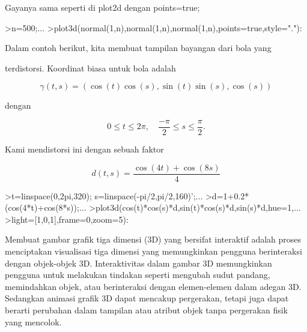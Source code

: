 \documentclass[a4paper,10pt]{article}
\begin{document}
\begin{eulernotebook}
\begin{eulercomment}
\begin{eulercomment}
\begin{eulercomment}
Gayanya sama seperti di plot2d dengan points=true;
\end{eulercomment}
\begin{eulerprompt}
>n=500;...
>plot3d(normal(1,n),normal(1,n),normal(1,n),points=true,style="."):
\end{eulerprompt}
\begin{eulercomment}
\end{eulercomment}
\begin{eulerttcomment}
 Dalam contoh berikut, kita membuat tampilan bayangan dari bola yang
\end{eulerttcomment}
\begin{eulercomment}
terdistorsi. Koordinat biasa untuk bola adalah

\end{eulercomment}
\begin{eulerformula}
\[
\gamma(t,s) = (\cos(t)\cos(s),\sin(t)\sin(s),\cos(s))
\]
\end{eulerformula}
\begin{eulercomment}
dengan

\end{eulercomment}
\begin{eulerformula}
\[
0 \le t \le 2\pi, \quad \frac{-\pi}{2} \le s \le \frac{\pi}{2}.
\]
\end{eulerformula}
\begin{eulercomment}
Kami mendistorsi ini dengan sebuah faktor

\end{eulercomment}
\begin{eulerformula}
\[
d(t,s) = \frac{\cos(4t)+\cos(8s)}{4}
\]
\end{eulerformula}
\begin{eulerprompt}
>t=linspace(0,2pi,320); s=linspace(-pi/2,pi/2,160)';...
>d=1+0.2*(cos(4*t)+cos(8*s));...
>plot3d(cos(t)*cos(s)*d,sin(t)*cos(s)*d,sin(s)*d,hue=1,...
>light=[1,0,1],frame=0,zoom=5):
\end{eulerprompt}
\begin{eulercomment}
Membuat gambar grafik tiga dimensi (3D) yang bersifat interaktif
adalah proses menciptakan visualisasi tiga dimensi yang memungkinkan
pengguna berinteraksi dengan objek-objek 3D. Interaktivitas dalam
gambar 3D memungkinkan pengguna untuk melakukan tindakan seperti
mengubah sudut pandang, memindahkan objek, atau berinteraksi dengan
elemen-elemen dalam adegan 3D. Sedangkan animasi grafik 3D dapat
mencakup pergerakan, tetapi juga dapat berarti perubahan dalam
tampilan atau atribut objek tanpa pergerakan fisik yang mencolok.


\end{eulercomment}
\end{eulercomment}
\end{eulercomment}
\end{eulernotebook}
\end{document}

